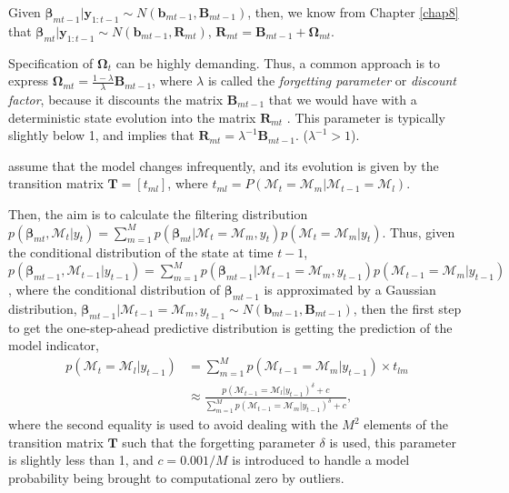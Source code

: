 Given $\bm{\beta}_{mt-1}|\bm{y}_{1:t-1}\sim N(\bm{b}_{mt-1},\bm{B}_{mt-1})$, then, we know from Chapter \ref{chap8} that $\bm{\beta}_{mt}|\bm{y}_{1:t-1}\sim N(\bm{b}_{mt-1}, \bm{R}_{mt})$, $\bm{R}_{mt}=\bm{B}_{mt-1}+\bm{\Omega}_{mt}$. 

Specification of $\bm{\Omega}_t$ can be highly demanding. Thus, a common approach is to express $\bm{\Omega}_{mt}=\frac{1-\lambda}{\lambda}\bm{B}_{mt-1}$, where $\lambda$ is called the \textit{forgetting parameter} or \textit{discount factor}, because it discounts the matrix $\bm{B}_{mt-1}$ that we would have with a deterministic state evolution into the matrix $\bm{R}_{mt}$ \cite[Chap.~4]{petris2009dynamic}. This parameter is typically slightly below 1, and implies that $\bm{R}_{mt}=\lambda^{-1}\bm{B}_{mt-1}$. ($\lambda^{-1}>1$).

\cite{raftery2010online} assume that the model changes infrequently, and its evolution is given by the transition matrix $\bm{T}=[t_{ml}]$, where $t_{ml}=P(\mathcal{M}_t=\mathcal{M}_m|\mathcal{M}_{t-1}=\mathcal{M}_l)$.

Then, the aim is to calculate the filtering distribution $p(\bm{\beta}_{mt},\mathcal{M}_t|y_t)=\sum_{m=1}^Mp(\bm{\beta}_{mt}|\mathcal{M}_t=\mathcal{M}_m,y_t)p(\mathcal{M}_t=\mathcal{M}_m|y_t)$. Thus, given the conditional distribution of the state at time $t-1$, $p(\bm{\beta}_{mt-1},\mathcal{M}_{t-1}|{y}_{t-1})=\sum_{m=1}^Mp(\bm{\beta}_{mt-1}|\mathcal{M}_{t-1}=\mathcal{M}_m,{y}_{t-1})p(\mathcal{M}_{t-1}=\mathcal{M}_m|{y}_{t-1})$, where the conditional distribution of $\bm{\beta}_{mt-1}$ is approximated by a Gaussian distribution, $\bm{\beta}_{mt-1}|\mathcal{M}_{t-1}=\mathcal{M}_{m},y_{t-1}\sim N(\bm{b}_{mt-1},\bm{B}_{mt-1})$, then the first step to get the one-step-ahead predictive distribution is getting the prediction of the model indicator, 
\begin{align*}
	p(\mathcal{M}_t=\mathcal{M}_l|y_{t-1})&=\sum_{m=1}^M p(\mathcal{M}_{t-1}=\mathcal{M}_m|y_{t-1})\times t_{lm}\\
	&\approx \frac{p(\mathcal{M}_{t-1}=\mathcal{M}_l|y_{t-1})^{\delta}+c}{\sum_{m=1}^M p(\mathcal{M}_{t-1}=\mathcal{M}_m|y_{t-1})^{\delta}+c},  
\end{align*}
where the second equality is used to avoid dealing with the $M^2$ elements of the transition matrix $\bm{T}$ such that the forgetting parameter $\delta$ is used, this parameter is slightly less than 1, and $c=0.001/M$ is introduced to handle a model probability being brought to computational zero by outliers.

